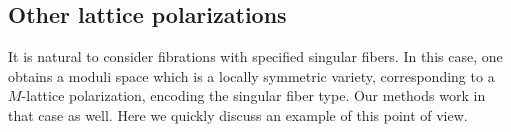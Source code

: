 \documentclass[11pt]{amsart}
\theoremstyle{definition}
\theoremstyle{remark}
\newcommand{\calO}{\mathcal O}
\begin{document}
	

	
	
	
	\subsection{Other lattice polarizations}
	It is natural to consider fibrations with specified singular fibers. In this case, one obtains a moduli space which is a locally symmetric variety, corresponding to a $M$-lattice polarization, encoding the singular fiber type. Our methods work in that case as well. Here we quickly discuss an example of this point of view.
	
	
	
\end{document}
